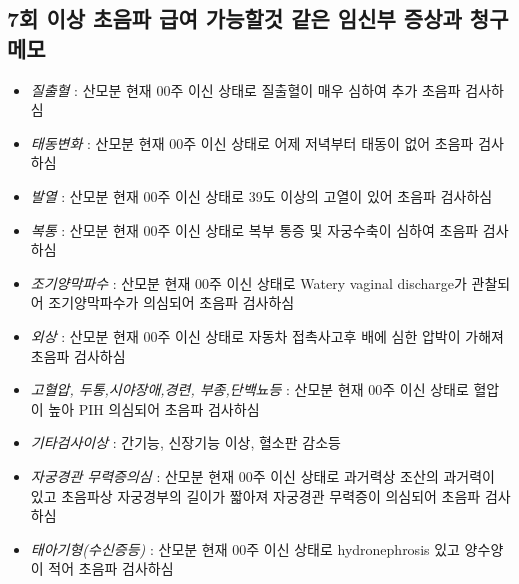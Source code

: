 \subsection{7회 이상 초음파 급여 가능할것 같은 임신부 증상과 청구메모}
\begin{itemize}\tightlist
\item \emph{질출혈} : 산모분 현재 00주 이신 상태로 질출혈이 매우 심하여 추가 초음파 검사하심
\item \emph{태동변화} : 산모분 현재 00주 이신 상태로 어제 저녁부터 태동이 없어 초음파 검사하심
\item \emph{발열} : 산모분 현재 00주 이신 상태로 39도 이상의 고열이 있어 초음파 검사하심
\item \emph{복통} : 산모분 현재 00주 이신 상태로 복부 통증 및 자궁수축이 심하여 초음파 검사하심
\item \emph{조기양막파수} : 산모분 현재 00주 이신 상태로 Watery vaginal discharge가 관찰되어 조기양막파수가 의심되어 초음파 검사하심
\item \emph{외상} : 산모분 현재 00주 이신 상태로 자동차 접촉사고후 배에 심한 압박이 가해져 초음파 검사하심
\item \emph{고혈압, 두통,시야장애,경련, 부종,단백뇨등} : 산모분 현재 00주 이신 상태로 혈압이 높아 PIH 의심되어 초음파 검사하심
\item \emph{기타검사이상} : 간기능, 신장기능 이상, 혈소판 감소등
\item \emph{자궁경관 무력증의심} : 산모분 현재 00주 이신 상태로 과거력상 조산의 과거력이 있고 초음파상 자궁경부의 길이가 짧아져 자궁경관 무력증이 의심되어 초음파 검사 하심
\item \emph{태아기형(수신증등)} : 산모분 현재 00주 이신 상태로 hydronephrosis 있고 양수양이 적어 초음파 검사하심
\end{itemize}

\prezi{\clearpage}
